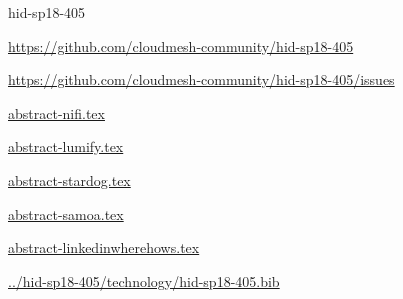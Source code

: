\begin{IU}

hid-sp18-405

\url{https://github.com/cloudmesh-community/hid-sp18-405}

\url{https://github.com/cloudmesh-community/hid-sp18-405/issues}

\href{https://github.com/cloudmesh-community/hid-sp18-405/blob/master//technology/abstract-nifi.tex}{abstract-nifi.tex}

\href{https://github.com/cloudmesh-community/hid-sp18-405/blob/master//technology/abstract-lumify.tex}{abstract-lumify.tex}

\href{https://github.com/cloudmesh-community/hid-sp18-405/blob/master//technology/abstract-stardog.tex}{abstract-stardog.tex}

\href{https://github.com/cloudmesh-community/hid-sp18-405/blob/master//technology/abstract-samoa.tex}{abstract-samoa.tex}

\href{https://github.com/cloudmesh-community/hid-sp18-405/blob/master//technology/abstract-linkedinwherehows.tex}{abstract-linkedinwherehows.tex}

\href{https://github.com/cloudmesh-community/hid-sp18-405/blob/master//technology/hid-sp18-405.bib}{../hid-sp18-405/technology/hid-sp18-405.bib}

\end{IU}


